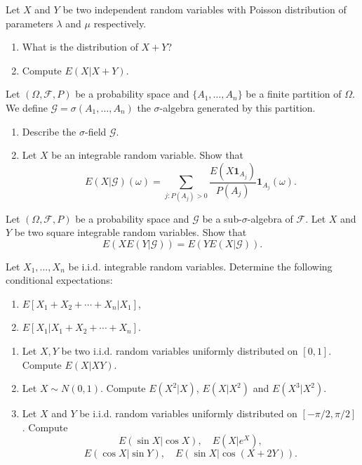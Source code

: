 
\begin{exercise}
Let \(X\) and \(Y\) be two independent random variables with Poisson distribution of parameters \(\lambda\) and \(\mu\) respectively.
\begin{enumerate}
    \item What is the distribution of \(X + Y\)?
    \item Compute \(E(X|X + Y)\).
\end{enumerate}
\end{exercise}

\begin{exercise}
Let \((\Omega, \mathcal{F}, P)\) be a probability space and \(\{A_1, \ldots, A_n\}\) be a finite partition of \(\Omega\). We define \(\mathcal{G} = \sigma(A_1, \ldots, A_n)\) the \(\sigma\)-algebra generated by this partition.
\begin{enumerate}
    \item Describe the \(\sigma\)-field \(\mathcal{G}\).
    \item Let \(X\) be an integrable random variable. Show that
    \[E(X|\mathcal{G})(\omega) = \sum_{j:P(A_j)>0} \frac{E(X\mathbf{1}_{A_j})}{P(A_j)} \mathbf{1}_{A_j}(\omega).\]
\end{enumerate}
\end{exercise}

\begin{exercise}
Let \((\Omega, \mathcal{F}, P)\) be a probability space and \(\mathcal{G}\) be a sub-\(\sigma\)-algebra of \(\mathcal{F}\). Let \(X\) and \(Y\) be two square integrable random variables. Show that
\[E(XE(Y|\mathcal{G})) = E(YE(X|\mathcal{G})).\]
\end{exercise}

\begin{exercise}
Let \(X_1, \ldots, X_n\) be i.i.d. integrable random variables. Determine the following conditional expectations:
\begin{enumerate}
    \item \(E[X_1 + X_2 + \cdots + X_n | X_1]\),
    \item \(E[X_1 | X_1 + X_2 + \cdots + X_n]\).
\end{enumerate}
\end{exercise}

\begin{exercise}
\begin{enumerate}
    \item Let \(X, Y\) be two i.i.d. random variables uniformly distributed on \([0, 1]\). Compute \(E(X|XY)\).

    \item Let \(X \sim N(0, 1)\). Compute \(E(X^2|X)\), \(E(X|X^2)\) and \(E(X^3|X^2)\).

    \item Let \(X\) and \(Y\) be i.i.d. random variables uniformly distributed on \([-\pi/2, \pi/2]\). Compute
    \[E(\sin X| \cos X), \quad E\left(X|e^X\right),\]
    \[E(\cos X|\sin Y), \quad E(\sin X| \cos(X + 2Y)).\]
\end{enumerate}
\end{exercise}

